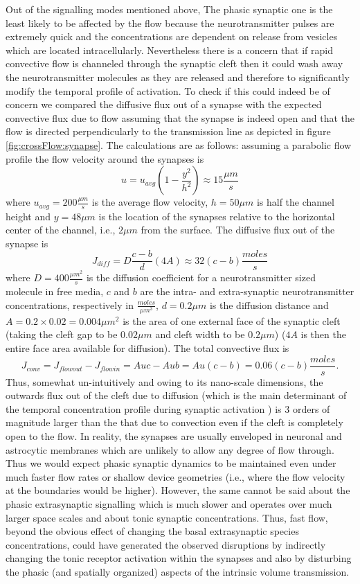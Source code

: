Out of the signalling modes mentioned above, The phasic synaptic one is the least likely to be affected by the flow because the neurotransmitter pulses are extremely quick and the concentrations are dependent on release from vesicles which are located intracellularly. Nevertheless there is a concern that if rapid convective flow is channeled through the synaptic cleft then it could wash away the neurotransmitter molecules as they are released and therefore to significantly modify the temporal profile of activation. To check if this could indeed be of concern we compared the diffusive flux out of a synapse with the expected convective flux due to flow assuming that the synapse is indeed open and that the flow is directed perpendicularly to the transmission line as depicted in figure \ref{fig:crossFlow:synapse}. The calculations are as follows: assuming a parabolic flow profile the flow velocity around the synapses is \[u=u_{avg}(1-\frac{y^{2}}{h^{2}})\approx 15\frac{\mu m}{s}\] where \(u_{avg}=200\frac{\mu m}{s}\) is the average flow velocity, \(h=50\mu m\) is half the channel height and \(y=48\mu m\) is the location of the synapses relative to the horizontal center of the channel, i.e., \(2\mu m\) from the surface. The diffusive flux out of the synapse is \[J_{diff}=D\frac{c-b}{d}(4A)\approx 32(c-b)\frac{moles}{s}\] where \(D=400\frac{\mu m^{2}}{s}\) is the diffusion coefficient for a neurotransmitter sized molecule in free media, \(c\) and \(b\) are the intra- and extra-synaptic neurotransmitter concentrations, respectively in \(\frac{moles}{\mu m^{3}}\), \(d=0.2\mu m\) is the diffusion distance and \(A=0.2\times 0.02=0.004\mu m^{2}\) is the area of one external face of the synaptic cleft (taking the cleft gap to be \(0.02\mu m\) and cleft width to be \(0.2\mu m\)) (\(4A\) is then the entire face area available for diffusion). The total convective flux is \[J_{conv}=J_{flowout}-J_{flowin}=Auc-Aub=Au(c-b)=0.06(c-b)\frac{moles}{s}.\] Thus, somewhat un-intuitively and owing to its nano-scale dimensions, the outwards flux out of the cleft due to diffusion (which is the main determinant of the temporal concentration profile during synaptic activation \cite{clements1996transmitter}) is 3 orders of magnitude larger than the that due to convection even if the cleft is completely open to the flow. In reality, the synapses are usually enveloped in neuronal and astrocytic membranes which are unlikely to allow any degree of flow through. Thus we would expect phasic synaptic dynamics to be maintained even under much faster flow rates or shallow device geometries (i.e., where the flow velocity at the boundaries would be higher). However, the same cannot be said about the phasic extrasynaptic signalling which is much slower and operates over much larger space scales and about tonic synaptic concentrations. Thus, fast flow, beyond the obvious effect of changing the basal extrasynaptic species concentrations, could have generated the observed disruptions by indirectly changing the tonic receptor activation within the synapses and also by disturbing the phasic (and spatially organized) aspects of the intrinsic volume transmission.




